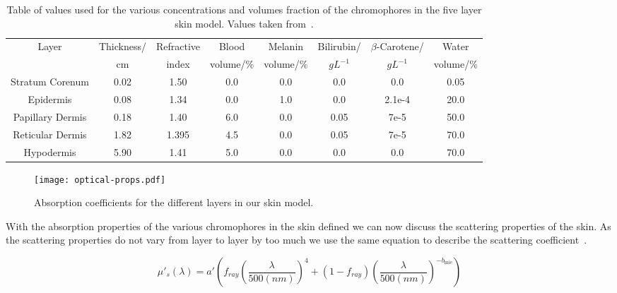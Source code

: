 \begin{table}[!tbhp] 
    \begin{adjustwidth}{-.5in}{-.5in}  

  \begin{center}
  \begin{tabular}{|c|c|c|c|c|c|c|c|}
  \hline
  Layer & Thickness/ & Refractive & Blood & Melanin & Bilirubin/ & $\beta$-Carotene/ & Water\\
    &cm & index & volume/\% & volume/\% & $gL^{-1}$ & $gL^{-1}$ & volume/\%\\
  \hline
  Stratum Corenum  & 0.02 & 1.50  & 0.0 & 0.0 & 0.0  & 0.0 & 0.05\\
  Epidermis        & 0.08 & 1.34  & 0.0 & 1.0 & 0.0  & 2.1e-4 & 20.0\\
  Papillary Dermis & 0.18 & 1.40  & 6.0 & 0.0 & 0.05 & 7e-5 & 50.0\\
  Reticular Dermis & 1.82 & 1.395 & 4.5 & 0.0 & 0.05 & 7e-5 & 70.0\\
  Hypodermis       & 5.90 & 1.41  & 5.0 & 0.0 & 0.0  & 0.0 & 70.0\\

  \hline
  \end{tabular}
    \caption{Table of values used for the various concentrations and volumes fraction of the chromophores in the five layer skin model. Values taken from~\cite{krishnaswamy2004biophysically,meglinski2002quantitative,campbell20153d,iglesias2015biophysically}.}
  \label{tab:optpropsvals}
  \end{center}
      \end{adjustwidth}

\end{table}


\begin{figure}[!htpb]
  \centering
  \texttt{[image: optical-props.pdf]}
  \caption{Absorption coefficients for the different layers in our skin model.}
  \label{fig:absoplayers}
\end{figure}


With the absorption properties of the various chromophores in the skin defined we can now discuss the scattering properties of the skin.
As the scattering properties do not vary from layer to layer by too much we use the same equation to describe the scattering coefficient~\cite{jacques2013optical,iglesias2015biophysically,louisethesis}.

\begin{equation}
\mu'_s(\lambda)=a'\left(f_{ray}\left(\frac{\lambda}{500(nm)}\right)^4+(1-f_{ray})\left(\frac{\lambda}{500(nm)}\right)^{-b_{\text{mie}}}\right)
\label{eqn:scattrest}
\end{equation}

